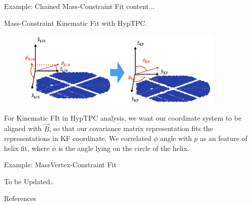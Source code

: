 \documentclass[
	xcolor=dvipsnames,
	aspectratio=169,	
	10pt, 
	]{beamer}
\begin{document}
\begin{frame}{Example: Chained Mass-Constraint Fit}
	content...
\end{frame}
\begin{frame}{Mass-Constraint Kinematic Fit with HypTPC.}
	\begin{block}{}
		\begin{figure}
			\includegraphics[width=0.9\textwidth]{Coords_K18_KF}
		\end{figure}
		For Kinematic FIt in HypTPC analysis, we want our coordinate system to be aligned with $\vec B$, so that our covariance matrix representation fits the representations in KF coordinate. We correlated $\phi$ angle with $p$ as an feature of helix fit, where $\phi$ is the angle lying on the circle of the helix. 
	\end{block}
\end{frame}

\begin{frame}{Example: MassVertex-Constraint Fit}
	\begin{block}{}
To be Updated..
	\end{block}
\end{frame}
\begin{frame}{References}
	 	\printbibliography
\end{frame}
\end{document}
